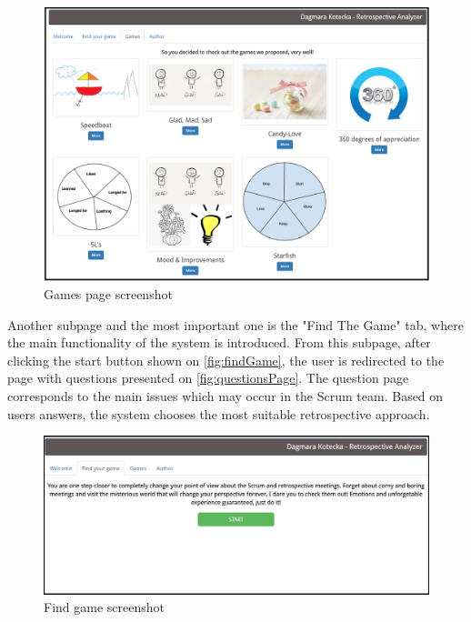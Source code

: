 \begin{figure}[h]
\caption{Games page screenshot}
\label{fig:gamesPage}
\centering
\includegraphics[width=1\textwidth]{screenshots/games.png}
\end{figure}

Another subpage and the most important one is the "Find The Game" tab, where the main functionality of the system is introduced. From this subpage, after clicking the start button shown on \autoref{fig:findGame}, the user is redirected to the page with questions presented on \autoref{fig:questionsPage}. The question page corresponds to the main issues which may occur in the Scrum team. Based on users answers, the system chooses the most suitable retrospective approach.

\begin{figure}[h]
\caption{Find game screenshot}
\label{fig:findGame}
\centering
\includegraphics[width=1\textwidth]{screenshots/find.png}
\end{figure}


